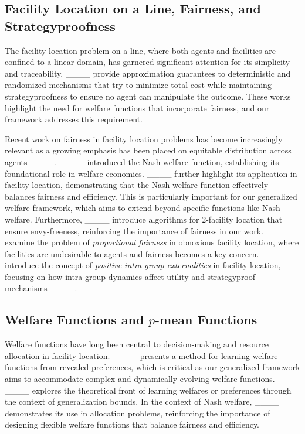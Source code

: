 \subsection{Facility Location on a Line, Fairness, and Strategyproofness}
The facility location problem on a line, where both agents and facilities are confined to a linear domain, has garnered significant attention for its simplicity and traceability. ____ provide approximation guarantees to deterministic and randomized mechanisms that try to minimize total cost while maintaining strategyproofness to ensure no agent can manipulate the outcome. These works highlight the need for welfare functions that incorporate fairness, and our framework addresses this requirement.


Recent work on fairness in facility location problems has become increasingly relevant as a growing emphasis has been placed on equitable distribution across agents ____. ____ introduced the Nash welfare function, establishing its foundational role in welfare economics. ____ further highlight its application in facility location, demonstrating that the Nash welfare function effectively balances fairness and efficiency.
 This is particularly important for our generalized welfare framework, which aims to extend beyond specific functions like Nash welfare. Furthermore, ____ introduce algorithms for 2-facility location that ensure envy-freeness, reinforcing the importance of fairness in our work.  ____ examine the problem of \textit{proportional fairness} in obnoxious facility location, where facilities are undesirable to agents and fairness becomes a key concern. ____ introduce the concept of \textit{positive intra-group externalities} in facility location, focusing on how intra-group dynamics affect utility and strategyproof mechanisms ____. 

\subsection{Welfare Functions and $p$-mean Functions}
Welfare functions have long been central to decision-making and resource allocation in facility location. 
____ presents a method for learning welfare functions from revealed preferences, which is critical as our generalized framework aims to accommodate complex and dynamically evolving welfare functions. ____ explores the theoretical front of learning welfares or preferences through the context of generalization bounds. In the context of Nash welfare, ____ demonstrates its use in allocation problems, reinforcing the importance of designing flexible welfare functions that balance fairness and efficiency.

